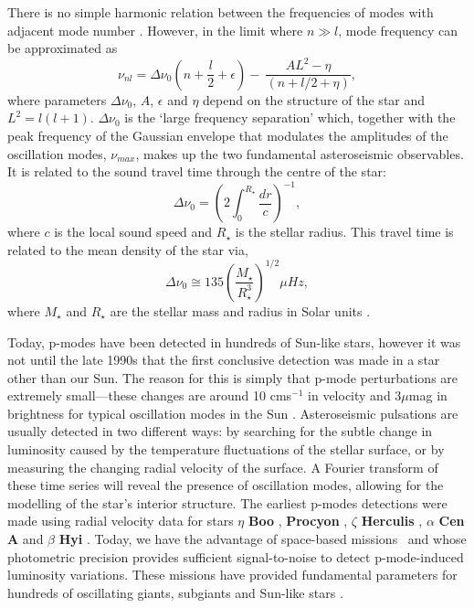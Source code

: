 There is no simple harmonic relation between the frequencies of modes with
adjacent mode number \citep{brown}.
However, in the limit where $n \gg l$, mode frequency can be approximated as
\begin{equation}
    \nu_{nl} = \Delta\nu_0\left(n + \frac{l}{2} + \epsilon \right) - \
    \frac{AL^2 - \eta}{(n + l/2 + \eta)},
\end{equation}
where parameters $\Delta\nu_0$, $A$, $\epsilon$ and $\eta$ depend on the
structure of the star and $L^2 = l(l+1)$.
$\Delta\nu_0$ is the `large frequency separation' which, together with the
peak frequency of the Gaussian envelope that modulates the amplitudes of the
oscillation modes, $\nu_{max}$, makes up the two fundamental asteroseismic
observables.
It is related to the sound travel time through the centre of the star:
\begin{equation}
\Delta\nu_0 = \left(2\int_0^{R_\star}\frac{dr}{c}\right)^{-1},
\end{equation}
where $c$ is the local sound speed and $R_\star$ is the stellar radius.
This travel time is related to the mean density of the star via,
\begin{equation}
\Delta\nu_0 \cong 135\left(\frac{M_\star}{R_\star^3}\right)^{1/2}\mu Hz,
\end{equation}
where $M_\star$ and $R_\star$ are the stellar mass and radius in Solar units
\citep{cox, brown}.

Today, p-modes have been detected in hundreds of Sun-like stars, however it
was not until the late 1990s that the first conclusive detection was made in
a star other than our Sun.
The reason for this is simply that p-mode perturbations are extremely
small---these changes are around 10 cms$^{-1}$ in velocity and 3$\mu$mag in
brightness for typical oscillation modes in the Sun \citep{brown2000}.
Asteroseismic pulsations are usually detected in two different ways: by
searching for the subtle change in luminosity caused by the temperature
fluctuations of the stellar surface, or by measuring the changing radial
velocity of the surface.
A Fourier transform of these time series will reveal the presence of
oscillation modes, allowing for the modelling of the star's interior
structure.
The earliest p-modes detections were made using radial velocity data
\citep{kjeldsen2001} for stars $\eta$ {\bf Boo} \citep{kjeldsen1995}, {\bf
Procyon} \citep{barban1999, martic1999}, $\zeta$ {\bf Herculis}
\citep{martic2001}, $\alpha$ {\bf Cen A} \citep{kjeldsen1999} and $\beta$ {\bf
Hyi} \citep{bedding2001}.
Today, we have the advantage of space-based missions \kepler\ and \corot whose
photometric precision provides sufficient signal-to-noise to detect
p-mode-induced luminosity variations.
These missions have provided fundamental parameters for hundreds of
oscillating giants, subgiants and Sun-like stars \citep[e.g.][]{michel2008,
bruntt2009, chaplin2014}.

